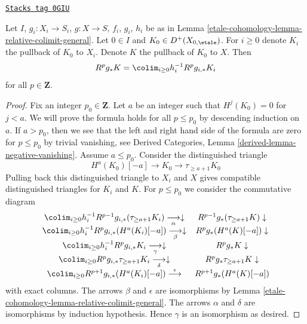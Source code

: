 \begin{lemma}
\label{etale-cohomology-lemma-relative-colimit-general-complexes}
\href{https://stacks.math.columbia.edu/tag/0GIU}{\texttt{Stacks tag 0GIU}}

Let $I$, $g_i : X_i \to S_i$, $g : X \to S$, $f_i$, $g_i$, $h_i$ be as in
Lemma \ref{etale-cohomology-lemma-relative-colimit-general}.
Let $0 \in I$ and $K_0 \in D^+(X_{0, \etale})$.
For $i \geq 0$ denote $K_i$ the pullback of $K_0$ to $X_i$.
Denote $K$ the pullback of $K_0$ to $X$. Then
$$
R^pg_*K = \colim_{i \geq 0} h_i^{-1}R^pg_{i, *}K_i
$$
for all $p \in \mathbf{Z}$.
\end{lemma}

\begin{proof}
Fix an integer $p_0 \in \mathbf{Z}$.
Let $a$ be an integer such that $H^j(K_0) = 0$ for $j < a$.
We will prove the formula holds for all $p \leq p_0$
by descending induction on $a$. If
$a > p_0$, then we see that the left and right hand side of
the formula are zero for $p \leq p_0$ by trivial vanishing, see
Derived Categories, Lemma \ref{derived-lemma-negative-vanishing}.
Assume $a \leq p_0$. Consider the distinguished triangle
$$
H^a(K_0)[-a] \to K_0 \to \tau_{\geq a + 1}K_0
$$
Pulling back this distinguished triangle to $X_i$ and $X$
gives compatible distinguished triangles for $K_i$ and $K$.
For $p \leq p_0$ we consider the commutative diagram
$$
\begin{array}{cc}\colim_{i \geq 0} h_i^{-1}R^{p - 1}g_{i, *}(\tau_{\geq a + 1}K_i)
\underset{\alpha}{\longrightarrow}\downarrow & R^{p - 1}g_*(\tau_{\geq a + 1}K) \downarrow \\ \colim_{i \geq 0} h_i^{-1}R^pg_{i, *}(H^a(K_i)[-a])
\underset{\beta}{\longrightarrow}\downarrow & R^pg_*(H^a(K)[-a]) \downarrow \\ \colim_{i \geq 0} h_i^{-1}R^pg_{i, *}K_i
\underset{\gamma}{\longrightarrow}\downarrow & R^pg_*K \downarrow \\ \colim_{i \geq 0} R^pg_{i, *}\tau_{\geq a + 1}K_i
\underset{\delta}{\longrightarrow}\downarrow & R^pg_*\tau_{\geq a + 1}K \downarrow \\ \colim_{i \geq 0} R^{p + 1}g_{i, *}(H^a(K_i)[-a])
\overset{\epsilon}{\longrightarrow} & R^{p + 1}g_*(H^a(K)[-a])\end{array}
$$
with exact columns. The arrows $\beta$ and $\epsilon$ are isomorphisms by
Lemma \ref{etale-cohomology-lemma-relative-colimit-general}.
The arrows $\alpha$ and $\delta$ are isomorphisms
by induction hypothesis.
Hence $\gamma$ is an isomorphism as desired.
\end{proof}

